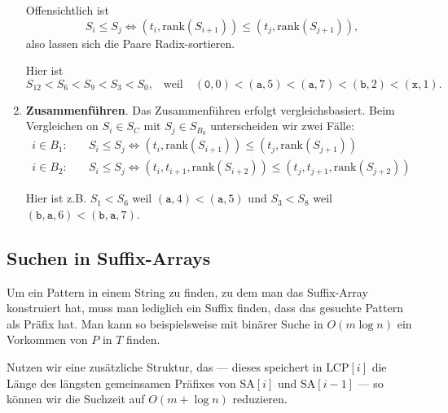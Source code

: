 \begin{enumerate}
  Offensichtlich ist
  \begin{equation*}
    S_i \leq S_j \Leftrightarrow \left( t_i, \text{rank}(S_{i+1}) \right) \leq \left( t_j, \text{rank}(S_{j+1}) \right)\text{,}
  \end{equation*}
  also lassen sich die Paare Radix-sortieren.

  Hier ist
  \begin{equation*}
    S_{12} < S_{6} < S_{9} < S_3 < S_0\text{,} \quad \text{weil} \quad \left( \texttt{0}, 0 \right) < \left( \texttt{a}, 5 \right) < \left( \texttt{a}, 7 \right) < \left( \texttt{b}, 2 \right) < \left( \texttt{x}, 1 \right)\text{.}
  \end{equation*}

  \item \textbf{Zusammenführen}. \quad Das Zusammenführen erfolgt vergleichsbasiert. Beim Vergleichen on \( S_i \in S_C \) mit \( S_j \in S_{B_0} \) unterscheiden wir zwei Fälle:
  \begin{align*}
    i \in B_1: \quad &S_i \leq S_j \Leftrightarrow \left( t_i, \text{rank}(S_{i+1}) \right) \leq \left( t_j, \text{rank}(S_{j+1}) \right) \\
    i \in B_2: \quad &S_i \leq S_j \Leftrightarrow \left( t_i, t_{i+1}, \text{rank}(S_{i+2}) \right) \leq \left( t_j, t_{j+1}, \text{rank}(S_{j+2}) \right)
  \end{align*}

  Hier ist z.B. \( S_1 < S_6 \) weil \( \left( \texttt{a}, 4 \right) < \left( \texttt{a}, 5 \right) \) und \( S_3 < S_8 \) weil \( \left( \texttt{b}, \texttt{a}, 6 \right) < \left( \texttt{b}, \texttt{a}, 7 \right) \).
\end{enumerate}

\subsection{Suchen in Suffix-Arrays}

Um ein Pattern in einem String zu finden, zu dem man das Suffix-Array konstruiert hat, muss man lediglich ein Suffix finden, dass das gesuchte Pattern als Präfix hat. Man kann so beispielsweise mit binärer Suche in \( O(m\log n) \) ein Vorkommen von \( P \) in \( T \) finden.

Nutzen wir eine zusätzliche Struktur, das  --- dieses speichert in \( \text{LCP}[i] \) die Länge des längsten gemeinsamen Präfixes von \( \text{SA}[i] \) und \( \text{SA}[i-1] \) --- so können wir die Suchzeit auf \( O(m + \log n) \) reduzieren.

